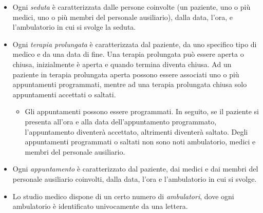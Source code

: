 \documentclass[11pt]{article}
\begin{document}
\begin{itemize}
\begin{itemize}
    \end{itemize}
    \item Ogni \emph{seduta} è caratterizzata dalle persone coinvolte (un paziente, uno o più medici, uno o più membri del personale ausiliario), dalla data, l’ora, e l’ambulatorio in cui si svolge la seduta.
    \item Ogni \emph{terapia prolungata} è caratterizzata dal paziente, da uno specifico tipo di medico e da una data di fine. Una terapia prolungata può essere aperta o chiusa, inizialmente è aperta e quando termina diventa chiusa. Ad un paziente in terapia prolungata aperta possono essere associati uno o più appuntamenti programmati, mentre ad una terapia prolungata chiusa solo appuntamenti accettati o saltati.
    \begin{itemize}
        \item Gli appuntamenti possono essere programmati. In seguito, se il paziente si presenta all’ora e alla data dell’appuntamento programmato, l’appuntamento diventerà accettato, altrimenti diventerà saltato. Degli appuntamenti programmati o saltati non sono noti ambulatorio, medici e membri del personale ausiliario.
    \end{itemize}
    \item Ogni \emph{appuntamento} è caratterizzato dal paziente, dai medici e dai membri del personale ausiliario coinvolti, dalla data, l’ora e l’ambulatorio in cui si svolge.
    \item Lo studio medico dispone di un certo numero di \emph{ambulatori}, dove ogni ambulatorio è identificato univocamente da una lettera.
\end{itemize}
\end{document}
